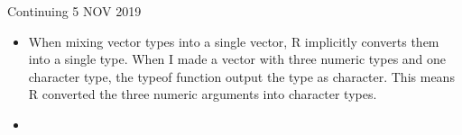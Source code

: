 \documentclass{article}
\begin{document}
Continuing 5 NOV 2019

\begin{itemize}
    \item When mixing vector types into a single vector, R implicitly converts them into a single type. When I made a vector with three numeric types and one character type, the typeof function output the type as character. This means R converted the three numeric arguments into character types.
    \item 
\end{itemize}
\end{document}
